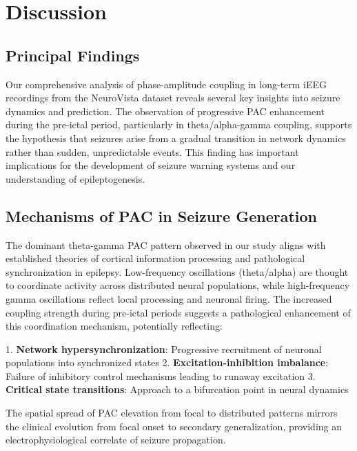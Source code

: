 
\section{Discussion}

\subsection{Principal Findings}
Our comprehensive analysis of phase-amplitude coupling in long-term iEEG recordings from the NeuroVista dataset reveals several key insights into seizure dynamics and prediction. The observation of progressive PAC enhancement during the pre-ictal period, particularly in theta/alpha-gamma coupling, supports the hypothesis that seizures arise from a gradual transition in network dynamics rather than sudden, unpredictable events. This finding has important implications for the development of seizure warning systems and our understanding of epileptogenesis.

\subsection{Mechanisms of PAC in Seizure Generation}
The dominant theta-gamma PAC pattern observed in our study aligns with established theories of cortical information processing and pathological synchronization in epilepsy. Low-frequency oscillations (theta/alpha) are thought to coordinate activity across distributed neural populations, while high-frequency gamma oscillations reflect local processing and neuronal firing. The increased coupling strength during pre-ictal periods suggests a pathological enhancement of this coordination mechanism, potentially reflecting:

1. \textbf{Network hypersynchronization}: Progressive recruitment of neuronal populations into synchronized states
2. \textbf{Excitation-inhibition imbalance}: Failure of inhibitory control mechanisms leading to runaway excitation
3. \textbf{Critical state transitions}: Approach to a bifurcation point in neural dynamics

The spatial spread of PAC elevation from focal to distributed patterns mirrors the clinical evolution from focal onset to secondary generalization, providing an electrophysiological correlate of seizure propagation.

